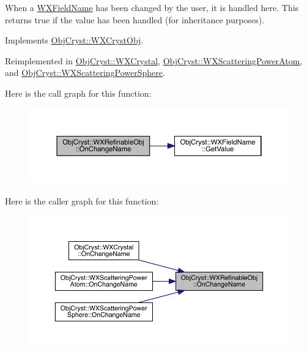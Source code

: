 When a \mbox{\hyperlink{class_obj_cryst_1_1_w_x_field_name}{W\+X\+Field\+Name}} has been changed by the user, it is handled here. This returns true if the value has been handled (for inheritance purposes). 

Implements \mbox{\hyperlink{class_obj_cryst_1_1_w_x_cryst_obj_a3736357599263df7e550790753c040a3}{Obj\+Cryst\+::\+W\+X\+Cryst\+Obj}}.



Reimplemented in \mbox{\hyperlink{class_obj_cryst_1_1_w_x_crystal_a7a15c2d1b5f5997ace336724fc396892}{Obj\+Cryst\+::\+W\+X\+Crystal}}, \mbox{\hyperlink{class_obj_cryst_1_1_w_x_scattering_power_atom_ac1b203e5de8d1827e6dba7f8715d1228}{Obj\+Cryst\+::\+W\+X\+Scattering\+Power\+Atom}}, and \mbox{\hyperlink{class_obj_cryst_1_1_w_x_scattering_power_sphere_a7f3614f0711d1a2ef1fca4a60789129e}{Obj\+Cryst\+::\+W\+X\+Scattering\+Power\+Sphere}}.

Here is the call graph for this function\+:
\nopagebreak
\begin{figure}[H]
\begin{center}
\leavevmode
\includegraphics[width=350pt]{class_obj_cryst_1_1_w_x_refinable_obj_a1a13aaa3b69044cff0d1c257dea2acb0_cgraph}
\end{center}
\end{figure}
Here is the caller graph for this function\+:
\nopagebreak
\begin{figure}[H]
\begin{center}
\leavevmode
\includegraphics[width=350pt]{class_obj_cryst_1_1_w_x_refinable_obj_a1a13aaa3b69044cff0d1c257dea2acb0_icgraph}
\end{center}
\end{figure}
\mbox{\label{class_obj_cryst_1_1_w_x_refinable_obj_acbf70975a79661a73a1ae3c39c9c3045}} 

